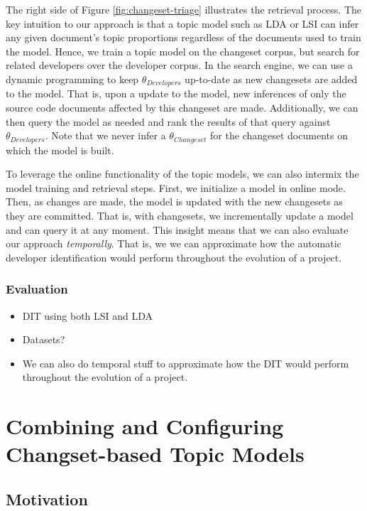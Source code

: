 \documentclass[12pt,draft]{Manuscript}
\begin{document}
\begin{body}
The right side of Figure \ref{fig:changeset-triage} illustrates the
retrieval process. The key intuition to our approach is that a topic
model such as LDA or LSI can infer any given document's topic
proportions regardless of the documents used to train the model. Hence,
we train a topic model on the changeset corpus, but search for related
developers over the developer corpus. In the search engine, we can use a
dynamic programming to keep \(\theta_{Developers}\) up-to-date as new
changesets are added to the model. That is, upon a update to the model,
new inferences of only the source code documents affected by this
changeset are made. Additionally, we can then query the model as needed
and rank the results of that query against \(\theta_{Developers}\). Note
that we never infer a \(\theta_{Changeset}\) for the changeset documents
on which the model is built.

To leverage the online functionality of the topic models, we can also
intermix the model training and retrieval steps. First, we initialize a
model in online mode. Then, as changes are made, the model is updated
with the new changesets as they are committed. That is, with changesets,
we incrementally update a model and can query it at any moment. This
insight means that we can also evaluate our approach \emph{temporally}.
That is, we we can approximate how the automatic developer
identification would perform throughout the evolution of a project.

\subsubsection{Evaluation}\label{evaluation-1}

\begin{itemize}
\itemsep1pt\parskip0pt
\item
  DIT using both LSI and LDA
\item
  Datasets?
\item
  We can also do temporal stuff to approximate how the DIT would perform
  throughout the evolution of a project.
\end{itemize}

\section{Combining and Configuring Changset-based Topic
Models}\label{study-config}

\subsection{Motivation}\label{motivation-3}


\end{body}
\end{document}
